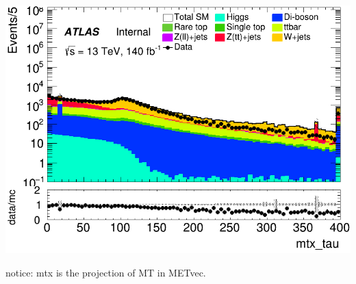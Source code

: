 \documentclass[usenames,dvipsnames]{beamer}
\begin{document}
\begin{frame}
\begin{minipage}{0.32\textwidth}
        \includegraphics[width=\textwidth]{graphics/LH_met/LH_met_mtx_tau.png}
    \end{minipage}
    notice: mtx is the projection of MT in METvec.
\end{frame}
\end{document}
